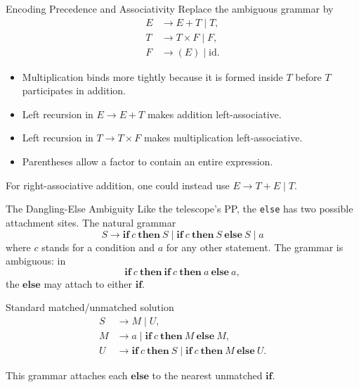 \documentclass[10pt]{beamer}
\begin{document}
\begin{frame}{Encoding Precedence and Associativity}
  Replace the ambiguous grammar by
  \[
    \begin{aligned}
      E&\to E+T\mid T,\\
      T&\to T\times F\mid F,\\
      F&\to(E)\mid\mathrm{id}.
    \end{aligned}
  \]
  \begin{itemize}
    \item Multiplication binds more tightly because it is formed inside $T$ before $T$ participates in addition.
    \item Left recursion in $E\to E+T$ makes addition left-associative.
    \item Left recursion in $T\to T\times F$ makes multiplication left-associative.
    \item Parentheses allow a factor to contain an entire expression.
  \end{itemize}
  For right-associative addition, one could instead use $E\to T+E\mid T$.
\end{frame}

\begin{frame}{The Dangling-Else Ambiguity}
  \small
  Like the telescope's PP, the \texttt{else} has two possible attachment sites.
  The natural grammar
  \[
    S\to \mathbf{if}\ c\ \mathbf{then}\ S
      \mid \mathbf{if}\ c\ \mathbf{then}\ S\ \mathbf{else}\ S
      \mid a
  \]
  where $c$ stands for a condition and $a$ for any other statement. The grammar
  is ambiguous: in
  \[
    \mathbf{if}\ c\ \mathbf{then}\
    \mathbf{if}\ c\ \mathbf{then}\ a\ \mathbf{else}\ a,
  \]
  the $\mathbf{else}$ may attach to either $\mathbf{if}$.
  \begin{block}{Standard matched/unmatched solution}
    \[
      \begin{aligned}
        S&\to M\mid U,\\
        M&\to a\mid \mathbf{if}\ c\ \mathbf{then}\ M\ \mathbf{else}\ M,\\
        U&\to \mathbf{if}\ c\ \mathbf{then}\ S
          \mid \mathbf{if}\ c\ \mathbf{then}\ M\ \mathbf{else}\ U.
      \end{aligned}
    \]
  \end{block}
  This grammar attaches each $\mathbf{else}$ to the nearest unmatched $\mathbf{if}$.
\end{frame}
\end{document}
